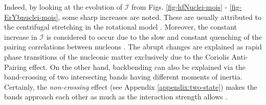 Indeed, by looking at the evolution of $\mathcal{I}$ from Figs. \ref{fig-hfNuclei-mois} - \ref{fig-ErYbnuclei-mois}, some sharp increases are noted. These are usually attributed to the centrifugal stretching in the rotational model \cite{davydov1960rotation}. Moreover, the constant increase in $\mathcal{I}$ is considered to occur due to the slow and constant quenching of the pairing correlations between nucleons \cite{mottelson1960effect}. The abrupt changes are explained as rapid phase transitions of the nucleonic matter \cite{krumlinde1974effect} exclusively due to the Coriolis Anti-Pairing effect. On the other hand, backbending can also be explained via the band-crossing of two intersecting bands having different moments of inertia. Certainly, the \emph{non-crossing} effect (see Appendix \ref{appendix:two-state}) makes the bands approach each other as much as the interaction strength allows \cite{ring2004nuclear}. 


